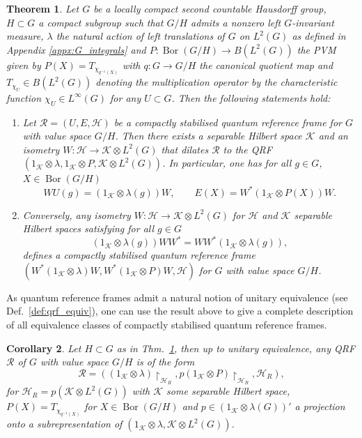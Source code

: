 \documentclass[sn-mathphys-num]{sn-jnl}%
\newcommand{\HH}{\mathcal{H}}
\newcommand{\KK}{\mathcal{K}}
\DeclareMathOperator{\Bor}{Bor}
\numberwithin{equation}{section}
\theoremstyle{thmstyleone}%
\newtheorem{theorem}{Theorem}[section]%
\newtheorem{corollary}[theorem]{Corollary}
\theoremstyle{thmstyletwo}%
\theoremstyle{thmstylethree}%
\begin{document}
\begin{theorem}
        \label{thm:qref_embed}
        Let $G$ be a locally compact second countable Hausdorff group, $H\subset G$ a compact subgroup such that $G/H$ admits a nonzero left $G$-invariant measure, $\lambda$ the natural action of left translations of $G$ on $L^2(G)$ as defined in Appendix \ref{appx:G_integrals} and $P:\Bor(G/H)\to B(L^2(G))$ the PVM given by $P(X)=T_{\chi_{q^{-1}(X)}}$ with $q:G\to G/H$ the canonical quotient map and $T_{\chi_{U}}\in B(L^2(G))$ denoting the multiplication operator by the characteristic function $\chi_U\in L^\infty(G)$ for any $U\subset G$. Then the following statements hold:
        \begin{enumerate}
            \item Let $\mathcal{R}=(U,E,\HH)$ be a compactly stabilised quantum reference frame for $G$ with value space $G/H$. Then there exists a separable Hilbert space $\KK$ and an isometry $W:\HH\to\KK\otimes L^2(G)$ that dilates $\mathcal{R}$ to the QRF $(1_\KK\otimes \lambda, 1_\KK\otimes P, \KK\otimes L^2(G))$. In particular, one has for all $g\in G$, $X\in\Bor(G/H)$
        \begin{equation}
            \label{eq:compact_QRF_compr}
            WU(g)=(1_\KK\otimes \lambda(g))W,\qquad E(X)=W^*(1_\KK\otimes P(X))W.
        \end{equation}
            \item Conversely, any isometry $W:\HH\to\KK\otimes L^2(G)$ for $\HH$ and $\KK$ separable Hilbert spaces satisfying for all $g\in G$
        \begin{equation}
            \label{eq:proj_invar}
            (1_\KK\otimes \lambda(g))WW^*=WW^*(1_\KK\otimes \lambda(g)),
        \end{equation}
        defines a compactly stabilised quantum reference frame $(W^*(1_\KK\otimes \lambda)W,W^*(1_\KK\otimes P)W,\HH)$ for $G$ with value space $G/H$.
        \end{enumerate}
    \end{theorem}
As quantum reference frames admit a natural notion of unitary equivalence (see Def.~\ref{def:qrf_equiv}), one can use the result above to give a complete description of all equivalence classes of compactly stabilised quantum reference frames.
    \begin{corollary}
    \label{cor:QRF_compact_subrep}
        Let $H\subset G$ as in Thm.\ \ref{thm:qref_embed}, then up to unitary equivalence, any QRF $\mathcal{R}$ of $G$ with value space $G/H$ is of the form
        \begin{equation}
            \mathcal{R}=((1_\KK\otimes \lambda)\restriction_{\HH_R},p(1_\KK\otimes P)\restriction_{\HH_R},\HH_R),
        \end{equation}
        for $\HH_R=p(\KK\otimes L^2(G))$ with $\KK$ some separable Hilbert space, $P(X)=T_{\chi_{q^{-1}(X)}}$ for $X\in\Bor(G/H)$ and $p\in(1_\KK\otimes \lambda(G))'$ a projection onto a subrepresentation of $(1_\KK\otimes \lambda,\KK\otimes L^2(G))$.
    \end{corollary}
\end{document}
